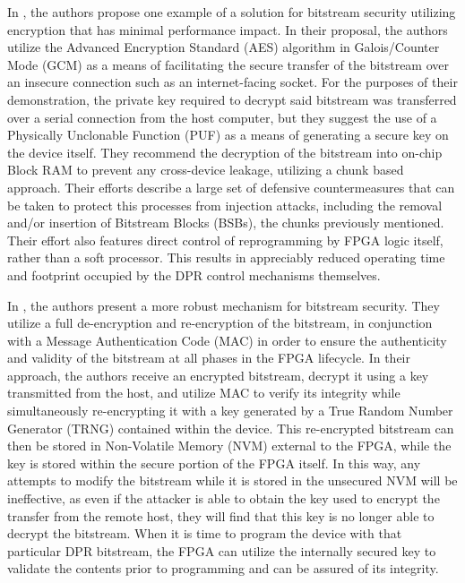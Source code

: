 In \cite{hori_bitstream_2013}, the authors propose one example of a solution for bitstream security utilizing encryption that has minimal performance impact. In their proposal, the authors utilize the Advanced Encryption Standard (AES) algorithm in Galois/Counter Mode (GCM) as a means of facilitating the secure transfer of the bitstream over an insecure connection such as an internet-facing socket. For the purposes of their demonstration, the private key required to decrypt said bitstream was transferred over a serial connection from the host computer, but they suggest the use of a Physically Unclonable Function (PUF) as a means of generating a secure key on the device itself. They recommend the decryption of the bitstream into on-chip Block RAM to prevent any cross-device leakage, utilizing a chunk based approach. Their efforts describe a large set of defensive countermeasures that can be taken to protect this processes from injection attacks, including the removal and/or insertion of Bitstream Blocks (BSBs), the chunks previously mentioned. Their effort also features direct control of reprogramming by FPGA logic itself, rather than a soft processor. This results in appreciably reduced operating time and footprint occupied by the DPR control mechanisms themselves.

In \cite{kashyap_compact_2016}, the authors present a more robust mechanism for bitstream security. They utilize a full de-encryption and re-encryption of the bitstream, in conjunction with a Message Authentication Code (MAC) in order to ensure the authenticity and validity of the bitstream at all phases in the FPGA lifecycle. In their approach, the authors receive an encrypted bitstream, decrypt it using a key transmitted from the host, and utilize MAC to verify its integrity while simultaneously re-encrypting it with a key generated by a True Random Number Generator (TRNG) contained within the device. This re-encrypted bitstream can then be stored in Non-Volatile Memory (NVM) external to the FPGA, while the key is stored within the secure portion of the FPGA itself. In this way, any attempts to modify the bitstream while it is stored in the unsecured NVM will be ineffective, as even if the attacker is able to obtain the key used to encrypt the transfer from the remote host, they will find that this key is no longer able to decrypt the bitstream. When it is time to program the device with that particular DPR bitstream, the FPGA can utilize the internally secured key to validate the contents prior to programming and can be assured of its integrity.

